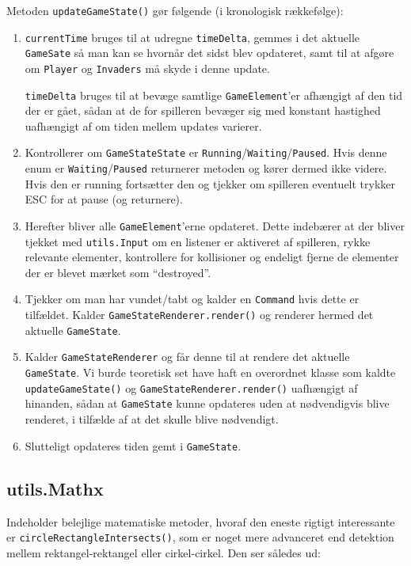 \documentclass[titlepage,danish]{article}
\newcommand{\code}[1]{\texttt{#1}}
\begin{document}
Metoden \code{updateGameState()} gør følgende (i kronologisk rækkefølge):
\begin{enumerate}

\item \code{currentTime} bruges til at udregne \code{timeDelta}, gemmes i det aktuelle
  \code{GameSate} så man kan se hvornår det sidst blev opdateret, samt til at afgøre om
  \code{Player} og \code{Invaders} må skyde i denne update.

\code{timeDelta} bruges til at bevæge samtlige \code{GameElement}’er afhængigt af den tid der er
gået, sådan at de for spilleren bevæger sig med konstant hastighed uafhængigt af om tiden mellem
updates varierer.

\item Kontrollerer om \code{GameStateState} er \code{Running}/\code{Waiting}/\code{Paused}. Hvis
denne enum er \code{Waiting}/\code{Paused} returnerer metoden og kører dermed ikke videre. Hvis den
er running fortsætter den og tjekker om spilleren eventuelt trykker ESC for at pause (og returnere).

\item Herefter bliver alle \code{GameElement}’erne opdateret. Dette indebærer at der bliver tjekket
med \code{utils.Input} om en listener er aktiveret af spilleren, rykke relevante elementer, kontrollere for
kollisioner og endeligt fjerne de elementer der er blevet mærket som ``destroyed''.

\item Tjekker om man har vundet/tabt og kalder en \code{Command} hvis dette er tilfældet. Kalder
\code{GameStateRenderer.render()} og renderer hermed det aktuelle \code{GameState}.

\item Kalder \code{GameStateRenderer} og får denne til at rendere det aktuelle \code{GameState}. Vi
burde teoretisk set have haft en overordnet klasse som kaldte \code{updateGameState()} og
\code{GameStateRenderer.render()} uafhængigt af hinanden, sådan at \code{GameState} kunne opdateres
uden at nødvendigvis blive renderet, i tilfælde af at det skulle blive nødvendigt.

\item Slutteligt opdateres tiden gemt i \code{GameState}.
\end{enumerate}


\subsection{utils.Mathx} Indeholder belejlige matematiske metoder, hvoraf den eneste rigtigt
interessante er \code{circleRectangleIntersects()}, som er noget mere advanceret end detektion
mellem rektangel-rektangel eller cirkel-cirkel. Den ser således ud:
\end{document}
